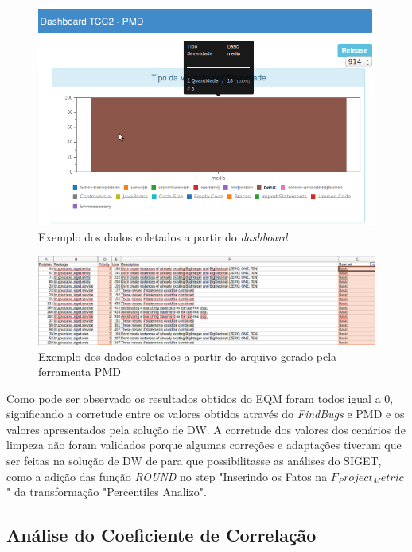 \begin{figure}[h!]
\centering
\includegraphics[keepaspectratio=false,scale=0.7,angle=90]{figuras/figuras_nilton/comparacaodash1.png}
\caption{Exemplo dos dados coletados a partir do \textit{dashboard}}
\label{comparacaodash}
\end{figure}

\begin{figure}[h!]
\centering
\includegraphics[keepaspectratio=false,scale=0.6,angle=90]{figuras/figuras_nilton/comparacaoexcell.png}
\caption{Exemplo dos dados coletados a partir do arquivo gerado pela ferramenta PMD}
\label{comparacaoexcell}
\end{figure}

Como pode ser observado os resultados obtidos do EQM foram todos igual a 0, significando a corretude entre os valores obtidos através do \textit{FindBugs} e PMD e os valores apresentados pela solução de DW. A corretude dos valores dos cenários de limpeza não foram validados porque algumas correções e adaptações tiveram que ser feitas na solução de DW de \cite{rego_monitoramento_2014TCC} para que possibilitasse as análises do SIGET, como a adição das função \textit{ROUND} no step "Inserindo os Fatos na $F_Project_Metric $" da transformação "Percentiles Analizo".  


\subsection{Análise do Coeficiente de Correlação}

